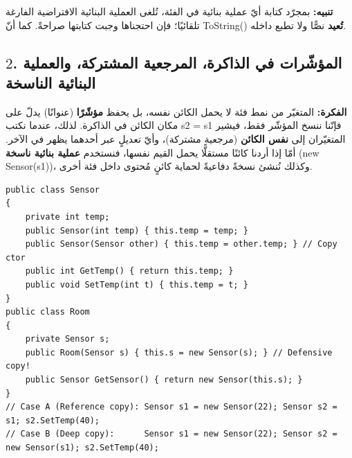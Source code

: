 \documentclass[14pt]{extarticle}
\begin{document}
\textbf{تنبيه:} بمجرّد كتابة أيّ عملية بنائية في الفئة، تُلغى العملية البنائية الافتراضية الفارغة تلقائيًا؛ فإن احتجناها وجبت كتابتها صراحةً. كما أنّ \textenglish{ToString()} \textbf{تُعيد} نصًّا ولا تطبع داخله.

\filbreak
\subsection*{$2$. المؤشّرات في الذاكرة، المرجعية المشتركة، والعملية البنائية الناسخة}
\textbf{الفكرة:} المتغيّر من نمط فئة لا يحمل الكائن نفسه، بل يحفظ \textbf{مؤشّرًا} (عنوانًا) يدلّ على مكان الكائن في الذاكرة. لذلك، عندما نكتب \textenglish{s2 = s1} فإنّنا ننسخ المؤشّر فقط، فيشير المتغيّران إلى \textbf{نفس الكائن} (مرجعية مشتركة)، وأيّ تعديلٍ عبر أحدهما يظهر في الآخر. أمّا إذا أردنا كائنًا مستقلًّا يحمل القيم نفسها، فنستخدم \textbf{عملية بنائية ناسخة} (\textenglish{new Sensor(s1)})، وكذلك نُنشئ نسخةً دفاعيةً لحماية كائنٍ مُحتوى داخل فئة أخرى.

\begin{boxCode}
\begin{english}
\begin{verbatim}
public class Sensor
{
    private int temp;
    public Sensor(int temp) { this.temp = temp; }
    public Sensor(Sensor other) { this.temp = other.temp; } // Copy ctor
    public int GetTemp() { return this.temp; }
    public void SetTemp(int t) { this.temp = t; }
}
public class Room
{
    private Sensor s;
    public Room(Sensor s) { this.s = new Sensor(s); } // Defensive copy!
    public Sensor GetSensor() { return new Sensor(this.s); }
}
// Case A (Reference copy): Sensor s1 = new Sensor(22); Sensor s2 = s1; s2.SetTemp(40);
// Case B (Deep copy):      Sensor s1 = new Sensor(22); Sensor s2 = new Sensor(s1); s2.SetTemp(40);
\end{verbatim}
\end{english}
\end{boxCode}
\end{document}
